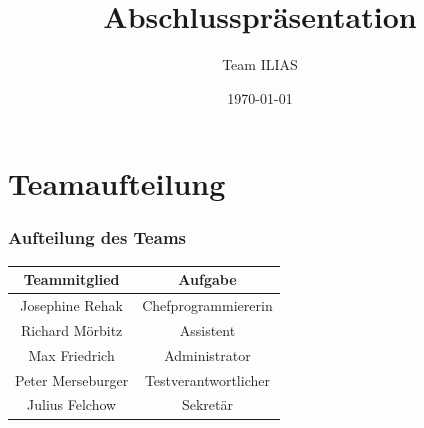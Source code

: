 \documentclass{beamer}
\title{Abschlusspräsentation}
\author{Team ILIAS}
\date{\today}
\begin{document}
	\maketitle
	\frame{\tableofcontents[]}
	\section{Teamaufteilung}
	\begin{frame}
		\frametitle{Aufteilung des Teams}
		\begin{center}
			\begin{tabular}{|c|c|}\hline
				Teammitglied & Aufgabe \\\hline
				Josephine Rehak & Chefprogrammiererin\\\hline
				Richard Mörbitz & Assistent\\\hline
				Max Friedrich & Administrator\\\hline
				Peter Merseburger & Testverantwortlicher\\\hline
				Julius Felchow & Sekretär\\\hline
			\end{tabular}
		\end{center}
	\end{frame} 
 
\end{document}
